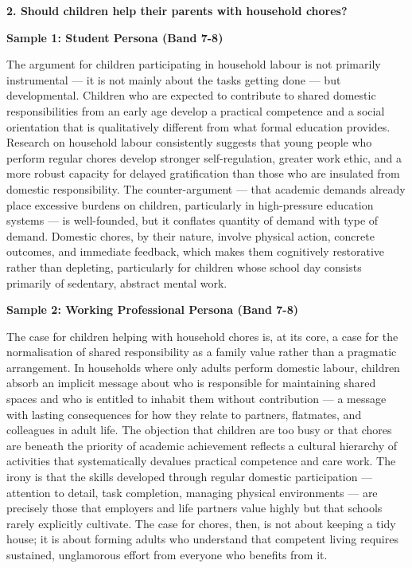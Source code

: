 \separator

\begin{ieltsquestion}
\textbf{2. Should children help their parents with household chores?}
\end{ieltsquestion}
\textbf{Sample 1: Student Persona (Band 7-8)}

The argument for children participating in household labour is not primarily instrumental — it is not mainly about the tasks getting done — but developmental. Children who are expected to contribute to shared domestic responsibilities from an early age develop a practical competence and a social orientation that is qualitatively different from what formal education provides. Research on household labour consistently suggests that young people who perform regular chores develop stronger self-regulation, greater work ethic, and a more robust capacity for delayed gratification than those who are insulated from domestic responsibility. The counter-argument — that academic demands already place excessive burdens on children, particularly in high-pressure education systems — is well-founded, but it conflates quantity of demand with type of demand. Domestic chores, by their nature, involve physical action, concrete outcomes, and immediate feedback, which makes them cognitively restorative rather than depleting, particularly for children whose school day consists primarily of sedentary, abstract mental work.

\textbf{Sample 2: Working Professional Persona (Band 7-8)}

The case for children helping with household chores is, at its core, a case for the normalisation of shared responsibility as a family value rather than a pragmatic arrangement. In households where only adults perform domestic labour, children absorb an implicit message about who is responsible for maintaining shared spaces and who is entitled to inhabit them without contribution — a message with lasting consequences for how they relate to partners, flatmates, and colleagues in adult life. The objection that children are too busy or that chores are beneath the priority of academic achievement reflects a cultural hierarchy of activities that systematically devalues practical competence and care work. The irony is that the skills developed through regular domestic participation — attention to detail, task completion, managing physical environments — are precisely those that employers and life partners value highly but that schools rarely explicitly cultivate. The case for chores, then, is not about keeping a tidy house; it is about forming adults who understand that competent living requires sustained, unglamorous effort from everyone who benefits from it.

